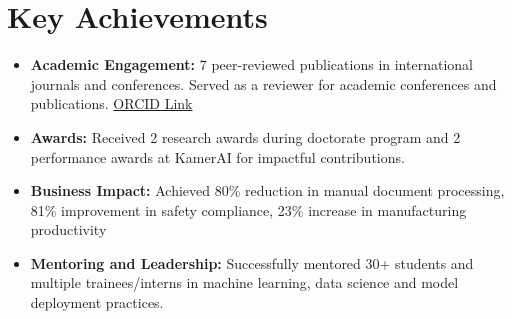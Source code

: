 \documentclass[a4paper,11pt]{article}
\begin{document}
\section{Key Achievements}
  \begin{itemize}[leftmargin=*, itemsep = -4pt]
    \item {\textbf{Academic Engagement: }7 peer-reviewed publications in international journals and conferences. Served as a reviewer for academic conferences and publications. \href{https://orcid.org/0000-0002-2247-9046}{ORCID Link}}
    \item {\textbf{Awards: }Received 2 research awards during doctorate program and 2 performance awards at KamerAI for impactful contributions.}
    \item{\textbf{Business Impact: }Achieved 80\% reduction in manual document processing, 81\% improvement in safety compliance, 23\% increase in manufacturing productivity}
    \item {\textbf{Mentoring and Leadership: }Successfully mentored 30+ students and multiple trainees/interns in machine learning, data science and model deployment practices.}
  \end{itemize}
\end{document}
